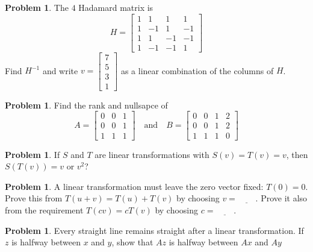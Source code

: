 \documentclass[10pt]{article}
\theoremstyle{definition}
\newtheorem{problem}[theorem]{Problem}
\newcommand{\1}[1]{\textbf{1}_{\left[#1\right]}} %
\begin{document}
\begin{problem}
  The $4$ Hadamard matrix is
  \begin{equation*}
    H=
    \begin{bmatrix}
      1&1&1&1\\
      1&-1&1&-1\\
      1&1&-1&-1\\
      1&-1&-1&1
    \end{bmatrix}
  \end{equation*}
  Find $H^{-1}$ and write $v=
  \begin{bmatrix}
    7\\5\\3\\1
  \end{bmatrix}
  $
  as a linear combination of the columns of $H$.
\end{problem}

\begin{problem}
  Find the rank and nullsapce of
  \begin{equation*}
    A=
    \begin{bmatrix}
      0&0&1\\
      0&0&1\\
      1&1&1
    \end{bmatrix}
    \quad \text{and} \quad
    B =
    \begin{bmatrix}
      0&0&1&2\\
      0&0&1&2\\
      1&1&1&0
    \end{bmatrix}
  \end{equation*}
\end{problem}

\begin{problem}
  If $S$ and $T$ are linear transformations with $S(v)=T(v)=v$, then
  $S(T(v))=v$ or $v^{2}$?
\end{problem}

\begin{problem}
  A linear transformation must leave the zero vector fixed: $T(0)=0$. Prove
  this from $T(u+v)=T(u)+T(v)$ by choosing $v=\underline{\phantom{hello}}$.
  Prove it also from the requirement $T(cv)=cT(v)$ by choosing
  $c=\underline{\phantom{hello}}$.
\end{problem}


\begin{problem}
  Every straight line remains straight after a linear transformation. If $z$
  is halfway between $x$ and $y$, show that $Az$ is halfway between $Ax$ and
  $Ay$
\end{problem}
\end{document}
